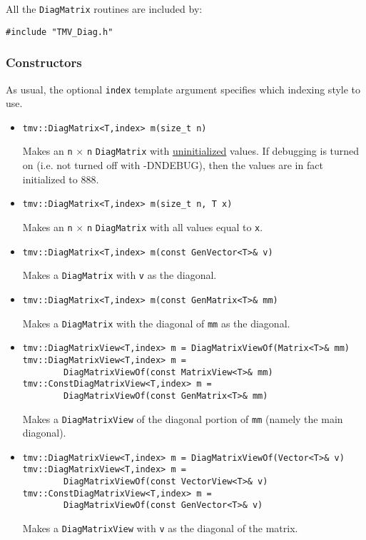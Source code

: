 \documentclass[twoside,letterpaper,11pt]{article}
\renewcommand{\tt}[1]{{\texttt {#1}}}
\begin{document}
All the \tt{DiagMatrix} routines are included by:
\begin{verbatim}
#include "TMV_Diag.h"
\end{verbatim}

\subsubsection{Constructors}

As usual, the optional \tt{index} template argument specifies which indexing
style to use.

\begin{itemize}
\item 
\begin{verbatim}
tmv::DiagMatrix<T,index> m(size_t n)
\end{verbatim}
Makes an \tt{n} $\times$ \tt{n} \tt{DiagMatrix} with \underline{uninitialized} values.
If debugging is turned on (i.e. not turned off
with -DNDEBUG), then the values are in fact initialized to 888. 

\item
\begin{verbatim}
tmv::DiagMatrix<T,index> m(size_t n, T x)
\end{verbatim}
Makes an \tt{n} $\times$ \tt{n} \tt{DiagMatrix} with all values equal to \tt{x}.

\item
\begin{verbatim}
tmv::DiagMatrix<T,index> m(const GenVector<T>& v)
\end{verbatim}
Makes a \tt{DiagMatrix} with \tt{v} as the diagonal.

\item 
\begin{verbatim}
tmv::DiagMatrix<T,index> m(const GenMatrix<T>& mm)
\end{verbatim}
Makes a \tt{DiagMatrix} with the diagonal of \tt{mm} as the diagonal.

\item
\begin{verbatim}
tmv::DiagMatrixView<T,index> m = DiagMatrixViewOf(Matrix<T>& mm)
tmv::DiagMatrixView<T,index> m = 
        DiagMatrixViewOf(const MatrixView<T>& mm)
tmv::ConstDiagMatrixView<T,index> m = 
        DiagMatrixViewOf(const GenMatrix<T>& mm)
\end{verbatim}
Makes a \tt{DiagMatrixView} of the diagonal portion of \tt{mm} (namely the main 
diagonal).

\item
\begin{verbatim}
tmv::DiagMatrixView<T,index> m = DiagMatrixViewOf(Vector<T>& v)
tmv::DiagMatrixView<T,index> m = 
        DiagMatrixViewOf(const VectorView<T>& v)
tmv::ConstDiagMatrixView<T,index> m = 
        DiagMatrixViewOf(const GenVector<T>& v)
\end{verbatim}
Makes a \tt{DiagMatrixView} with \tt{v} as the diagonal of the matrix.


\end{itemize}
\end{document}
